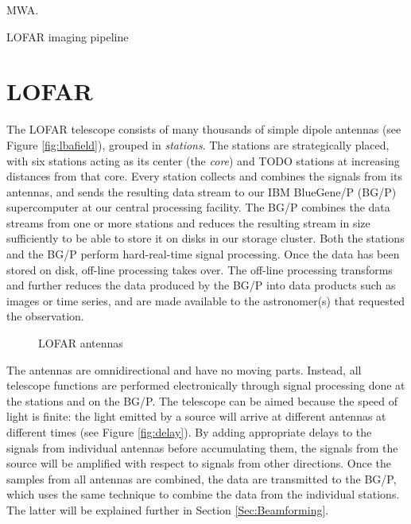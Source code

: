 \documentclass{llncs}
\begin{document}
MWA.

LOFAR imaging pipeline \cite{Romein:10a}

\section{LOFAR}
\label{Sec:LOFAR}

The LOFAR telescope consists of many thousands of simple dipole antennas (see Figure \ref{fig:lbafield}), grouped in \emph{stations}. The stations are strategically placed, with six stations acting as its center (the \emph{core}) and TODO stations at increasing distances from that core. Every station collects and combines the signals from its antennas, and sends the resulting data stream to our IBM BlueGene/P (BG/P) supercomputer at our central processing facility. The BG/P combines the data streams from one or more stations and reduces the resulting stream in size sufficiently to be able to store it on disks in our storage cluster. Both the stations and the BG/P perform hard-real-time signal processing. Once the data has been stored on disk, off-line processing takes over. The off-line processing transforms and further reduces the data produced by the BG/P into data products such as images or time series, and are made available to the astronomer(s) that requested the observation.

\begin{figure}[ht]
\hfill
{}
\caption{LOFAR antennas}
\end{figure}

The antennas are omnidirectional and have no moving parts. Instead, all telescope functions are performed electronically through signal processing done at the stations and on the BG/P. The telescope can be aimed because the speed of light is finite: the light emitted by a source will arrive at different antennas at different times (see Figure \ref{fig:delay}). By adding appropriate delays to the signals from individual antennas before accumulating them, the signals from the source will be amplified with respect to signals from other directions. Once the samples from all antennas are combined, the data are transmitted to the BG/P, which uses the same technique to combine the data from the individual stations. The latter will be explained further in Section \ref{Sec:Beamforming}.
\end{document}

